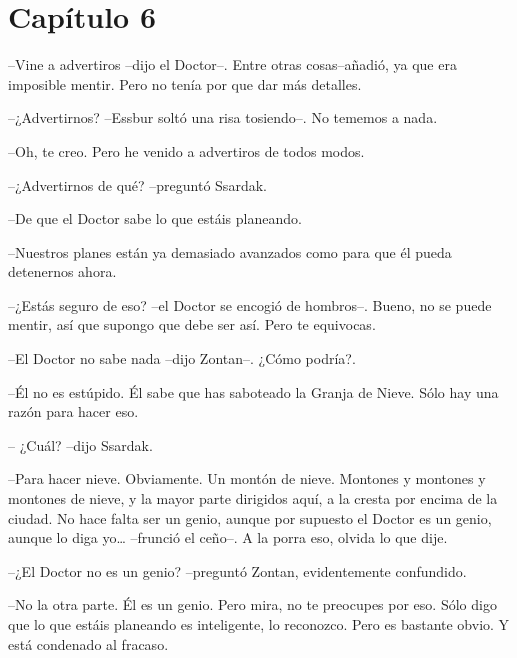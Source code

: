 \chapter*{Capítulo 6}

--Vine a advertiros --dijo el Doctor--. Entre otras cosas--añadió, ya que era imposible mentir. Pero no tenía por que dar más detalles.



--¿Advertirnos? --Essbur soltó una risa tosiendo--. No tememos a nada.



--Oh, te creo. Pero he venido a advertiros de todos modos.


--¿Advertirnos de qué? --preguntó Ssardak.



--De que el Doctor sabe lo que estáis planeando.



--Nuestros planes están ya demasiado avanzados como para que él pueda detenernos ahora.



--¿Estás seguro de eso? --el Doctor se encogió de hombros--. Bueno, no se puede mentir, así que supongo que debe ser así. Pero te equivocas. 



--El Doctor no sabe nada --dijo Zontan--. ¿Cómo podría?.



--Él no es estúpido. Él sabe que has saboteado la Granja de Nieve. Sólo hay una razón para hacer eso. 



-- ¿Cuál? --dijo Ssardak.



--Para hacer nieve. Obviamente. Un montón de nieve. Montones y montones y montones de nieve, y la mayor parte dirigidos aquí, a la cresta por encima de la ciudad. No hace falta ser un genio, aunque por supuesto el Doctor es un genio, aunque lo diga yo… --frunció el ceño--. A la porra eso, olvida lo que dije.



--¿El Doctor no es un genio? --preguntó Zontan, evidentemente confundido.



--No la otra parte. Él es un genio. Pero mira, no te preocupes por eso. Sólo digo que lo que estáis planeando es inteligente, lo reconozco. Pero es bastante obvio. Y está condenado al fracaso.



